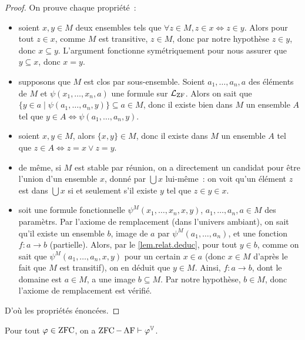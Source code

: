 \begin{proof}
  On prouve chaque propriété~:
  \begin{itemize}
  \item soient $x,y \in M$ deux ensembles tels que
    $\forall z \in M, z \in x \iff z \in y$. Alors pour tout $z \in x$, comme
    $M$ est transitive, $z \in M$, donc par notre hypothèse $z \in y$, donc
    $x \subseteq y$. L'argument fonctionne symétriquement pour nous assurer que
    $y \subseteq x$, donc $x = y$.
  \item supposons que $M$ est clos par sous-ensemble. Soient $a_1,\ldots,a_n,a$
    des éléments de $M$ et $\psi(x_1,\ldots,x_n,a)$ une formule sur
    $\mathcal L_{\operatorname{ZF}}$. Alors on sait que
    $\{ y \in a \mid \psi(a_1,\ldots,a_n,y)\} \subseteq a \in M$,
    donc il existe bien dans $M$ un ensemble $A$ tel que
    $y \in A \iff \psi(a_1,\ldots,a_n,y)$.
  \item soient $x,y \in M$, alors $\{x,y\} \in M$, donc il existe dans $M$ un
    ensemble $A$ tel que $z \in A \iff z = x \lor z = y$.
  \item de même, si $M$ est stable par réunion, on a directement un candidat
    pour être l'union d'un ensemble $x$, donné par $\bigcup x$ lui-même~: on
    voit qu'un élément $z$ est dans $\bigcup x$ si et seulement s'il existe
    $y$ tel que $z \in y \in x$.
  \item soit une formule fonctionnelle $\psi^M(x_1,\ldots,x_n,x,y)$,
    $a_1,\ldots,a_n,a \in M$ des paramètrs. Par l'axiome de remplacement (dans
    l'univers ambiant), on sait qu'il existe un ensemble $b$, image de $a$
    par $\psi^M(a_1,\ldots,a_n)$, et une fonction $f : a \to b$ (partielle).
    Alors, par le \cref{lem.relat.deduc}, pour tout $y \in b$, comme on sait que
    $\psi^M(a_1,\ldots,a_n,x,y)$ pour un certain $x \in a$ (donc $x \in M$
    d'après le fait que $M$ est transitif), on en déduit que $y \in M$.
    Ainsi, $f : a \to b$, dont le domaine est $a \in M$, a une image
    $b \subseteq M$. Par notre hypothèse, $b \in M$, donc l'axiome de
    remplacement est vérifié.
  \end{itemize}
  D'où les propriétés énoncées.
\end{proof}

\begin{theorem}\label{thm.V.ZFCAF}
  Pour tout $\varphi \in \operatorname{ZFC}$, on a $\operatorname{ZFC} - \operatorname{AF} \vdash \varphi^\mathbb V$.
\end{theorem}

